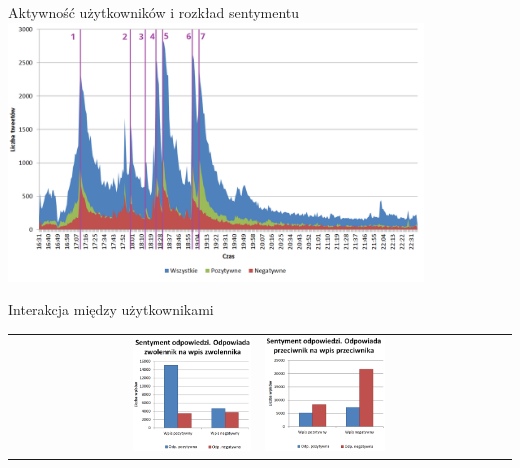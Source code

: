\documentclass{beamer}
\begin{document}
\begin{frame}{Aktywność użytkowników i rozkład sentymentu}
\includegraphics[width=11cm]{img/tweety-w-meczu-nums.png}
\end{frame}

\begin{frame}{Interakcja między użytkownikami}
\begin{adjustwidth}{-5cm}{-5cm}
\begin{table}
\begin{tabular}{rl}
\includegraphics[width=0.50\textwidth]{img/reply-sentiment-zwolennik-zwolennik.PNG}
&
\includegraphics[width=0.50\textwidth]{img/reply-sentiment-przeciwnik-przeciwnik.PNG}
\end{tabular}
\end{table}
\end{adjustwidth}
\end{frame}
\end{document}
